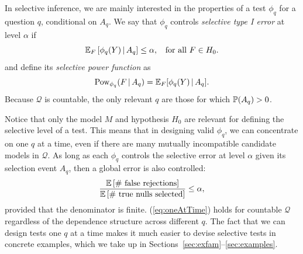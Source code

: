 \documentclass{article}
\theoremstyle{definition}
\newcommand{\cQ}{\mathcal{Q}}
\newcommand{\pow}{\text{Pow}}
\begin{document}
In selective inference, we are mainly interested in the properties of a test $\phi_q$ for a question $q$, conditional on $A_q$. We say that $\phi_q$ controls {\em selective type I error} at level $\alpha$ if
\begin{equation}\label{eq:selT1}
\E_F\left[\phi_q(Y) \gv A_q\right] \leq \alpha, \;\; \text{ for all } F\in H_0.
\end{equation}
and define its {\em selective power function} as
\begin{equation}\label{eq:selPow}
  \pow_{\phi_q}(F \gv A_q) = \E_{F}[\phi_q(Y) \gv A_q].
\end{equation}
Because $\cQ$ is countable, the only relevant $q$ are those for which $\P(A_q) > 0$.

Notice that only the model $M$ and hypothesis $H_0$ are relevant for defining the selective level of a test. This means that in designing valid $\phi_q$, we can concentrate on one $q$ at a time, even if there are many mutually incompatible candidate models in $\cQ$. As long as each $\phi_q$ controls the selective error at level $\alpha$ given its selection event $A_q$, then a global error is also controlled:
\begin{equation}\label{eq:oneAtTime}
  \frac{\E\left[\text{\# false rejections}\right]}{\E\left[\text{\# true nulls selected} \right]} \leq \alpha,
\end{equation}
provided that the denominator is finite. (\ref{eq:oneAtTime}) holds for countable $\cQ$ regardless of the dependence structure across different $q$. The fact that we can design tests one $q$ at a time makes it much easier to devise selective tests in concrete examples, which we take up in Sections~\ref{sec:exfam}--\ref{sec:examples}.
\end{document}
